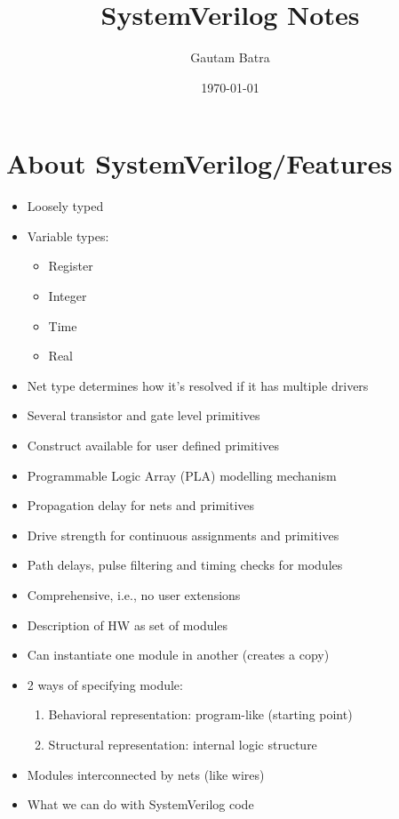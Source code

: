 \documentclass[11pt,twoside,a4paper,titlepage]{article}
\begin{document}
\title{SystemVerilog Notes}
\author{Gautam Batra}
\date{\today}
\maketitle


\section{About SystemVerilog/Features}
\begin{itemize}
    \item Loosely typed
    \item Variable types:
        \begin{itemize}
            \item Register
            \item Integer
            \item Time 
            \item Real
        \end{itemize}
    \item Net type determines how it's resolved if it has multiple drivers
    \item Several transistor and gate level primitives
    \item Construct available for user defined primitives
    \item Programmable Logic Array (PLA)  modelling mechanism
    \item Propagation delay for nets and primitives
    \item Drive strength for continuous assignments and primitives
    \item Path delays, pulse filtering and timing checks for modules
    \item Comprehensive, i.e., no user extensions
    \item Description of HW as set of modules
    \item Can instantiate one module in another (creates a copy)
    \item 2 ways of specifying module:
        \begin{enumerate}
            \item Behavioral representation: program-like (starting point)
            \item Structural representation: internal logic structure
        \end{enumerate}
    \item Modules interconnected by nets (like wires)
    \item What we can do with SystemVerilog code

\end{itemize}
\end{document}
